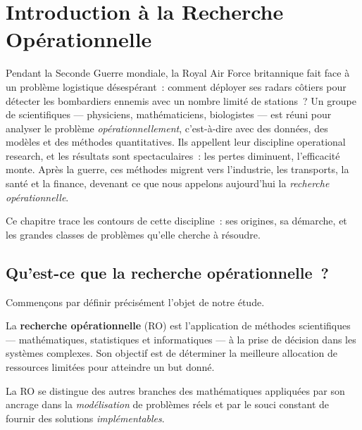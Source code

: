 \chapter{Introduction \`a la Recherche Op\'erationnelle}
\label{ch:introduction}

Pendant la Seconde Guerre mondiale, la Royal Air Force britannique fait face
\`a un probl\`eme logistique d\'esesp\'erant~: comment d\'eployer ses radars
c\^otiers pour d\'etecter les bombardiers ennemis avec un nombre limit\'e de
stations~? Un groupe de scientifiques --- physiciens, math\'ematiciens,
biologistes --- est r\'euni pour analyser le probl\`eme
\emph{op\'erationnellement}, c'est-\`a-dire avec des donn\'ees, des mod\`eles
et des m\'ethodes quantitatives. Ils appellent leur discipline
\og operational research\fg, et les r\'esultats sont spectaculaires~: les
pertes diminuent, l'efficacit\'e monte. Apr\`es la guerre, ces m\'ethodes
migrent vers l'industrie, les transports, la sant\'e et la finance,
devenant ce que nous appelons aujourd'hui la \emph{recherche
op\'erationnelle}.

Ce chapitre trace les contours de cette discipline~: ses origines, sa
d\'emarche, et les grandes classes de probl\`emes qu'elle cherche \`a
r\'esoudre.

\section{Qu'est-ce que la recherche op\'erationnelle~?}

Commen\c{c}ons par d\'efinir pr\'ecis\'ement l'objet de notre \'etude.

\begin{definition}
La \textbf{recherche op\'erationnelle} (RO) est l'application de m\'ethodes
scientifiques --- math\'ematiques, statistiques et informatiques --- \`a la prise
de d\'ecision dans les syst\`emes complexes.  Son objectif est de d\'eterminer la
meilleure allocation de ressources limit\'ees pour atteindre un but donn\'e.
\end{definition}

La RO se distingue des autres branches des math\'ematiques appliqu\'ees par son
ancrage dans la \emph{mod\'elisation} de probl\`emes r\'eels et par le souci
constant de fournir des solutions \emph{impl\'ementables}.

